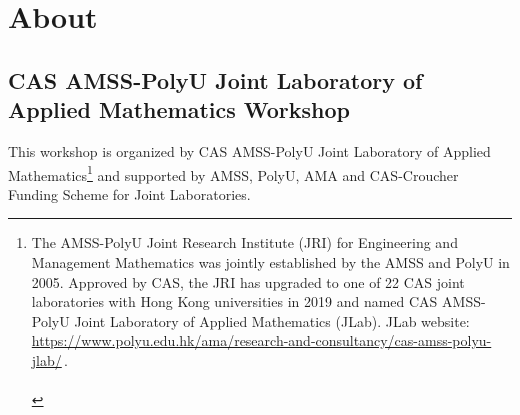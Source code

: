 \documentclass[
	openany, %
	parskip=full, %
	12pt, %
	a4paper, %
]{conferencebooklet} %
\begin{document}
\setcounter{page}{0}









\tableofcontents


\chapter{About}



\section{CAS AMSS-PolyU Joint Laboratory of Applied Mathematics Workshop}

This workshop is organized by CAS AMSS-PolyU  Joint Laboratory of Applied
Mathematics\footnote{The AMSS-PolyU Joint Research Institute (JRI) for Engineering and Management Mathematics was jointly established by the AMSS and PolyU in 2005. Approved by CAS, the JRI has upgraded to one of 22 CAS joint laboratories with Hong Kong universities in 2019 and named CAS AMSS-PolyU Joint Laboratory of Applied Mathematics (JLab).
JLab website:\\ \mbox{\url{https://www.polyu.edu.hk/ama/research-and-consultancy/cas-amss-polyu-jlab/}}\,.\\ \\ } and supported by AMSS, PolyU, AMA and CAS-Croucher Funding Scheme for Joint Laboratories.
\end{document}

